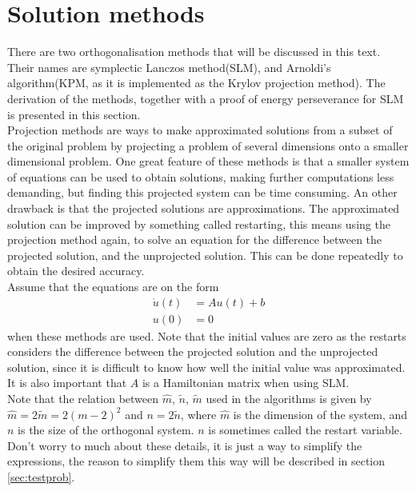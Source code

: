 \section{Solution methods} \label{sec:solmet} %
There are two orthogonalisation methods that will be discussed in this text. Their names are symplectic Lanczos method(SLM), and Arnoldi's algorithm(KPM, as it is implemented as the Krylov projection method). The derivation of the methods, together with a proof of energy perseverance for SLM is presented in this section. \\


Projection methods are ways to make approximated solutions from a subset of the original problem by projecting a problem of several dimensions onto a smaller dimensional problem. One great feature of these methods is that a smaller system of equations can be used to obtain solutions, making further computations less demanding, but finding this projected system can be time consuming. An other drawback is that the projected solutions are approximations. The approximated solution can be improved by something called restarting, this means using the projection method again, to solve an equation for the difference between the projected solution, and the unprojected solution. This can be done repeatedly to obtain the desired accuracy. \\

Assume that the equations are on the form
\begin{equation}
\begin{aligned}
\dot{u}(t) &= Au(t) + b \\
u(0) &= 0
\end{aligned}
\label{eqn:PMform}
\end{equation}
when these methods are used. Note that the initial values are zero as the restarts considers the difference between the projected solution and the unprojected solution, since it is difficult to know how well the initial value was approximated. It is also important that $A$ is a Hamiltonian matrix when using SLM. \\

Note that the relation between $\hat{m}$, $\tilde{n}$, $\tilde{m}$ used in the algorithms is given by $\hat{m} = 2\tilde{m}= 2(m-2)^2$ and $ n = 2\tilde{n}$, where $\hat{m}$ is the dimension of the system, and $n$ is the size of the orthogonal system. $n$ is sometimes called the restart variable. Don't worry to much about these details, it is just a way to simplify the expressions, the reason to simplify them this way will be described in section \ref{sec:testprob}. \\

